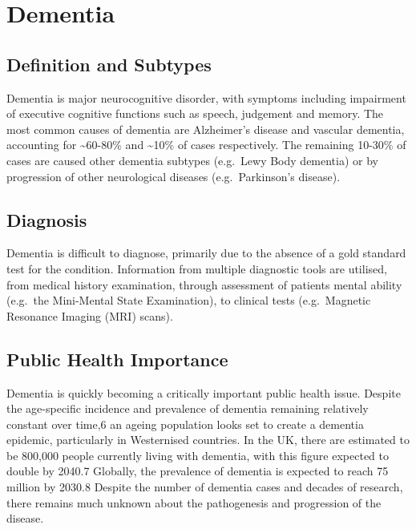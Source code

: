 \documentclass[a4paper, twoside]{templates/ociamthesis}
\begin{document}
\minitoc 

\hypertarget{dementia}{%
\section{Dementia}\label{dementia}}

\hypertarget{definition-and-subtypes}{%
\subsection{Definition and Subtypes}\label{definition-and-subtypes}}

Dementia is major neurocognitive disorder, with symptoms including impairment of executive cognitive functions such as speech, judgement and memory. The most common causes of dementia are Alzheimer's disease and vascular dementia, accounting for \textasciitilde60-80\% and \textasciitilde10\% of cases respectively. The remaining 10-30\% of cases are caused other dementia subtypes (e.g.~Lewy Body dementia) or by progression of other neurological diseases (e.g.~Parkinson's disease).

\hypertarget{diagnosis}{%
\subsection{Diagnosis}\label{diagnosis}}

Dementia is difficult to diagnose, primarily due to the absence of a gold standard test for the condition. Information from multiple diagnostic tools are utilised, from medical history examination, through assessment of patients mental ability (e.g.~the Mini-Mental State Examination), to clinical tests (e.g.~Magnetic Resonance Imaging (MRI) scans).

\hypertarget{public-health-importance}{%
\subsection{Public Health Importance}\label{public-health-importance}}

Dementia is quickly becoming a critically important public health issue. Despite the age-specific incidence and prevalence of dementia remaining relatively constant over time,6 an ageing population looks set to create a dementia epidemic, particularly in Westernised countries. In the UK, there are estimated to be 800,000 people currently living with dementia, with this figure expected to double by 2040.7 Globally, the prevalence of dementia is expected to reach 75 million by 2030.8 Despite the number of dementia cases and decades of research, there remains much unknown about the pathogenesis and progression of the disease.
\end{document}
